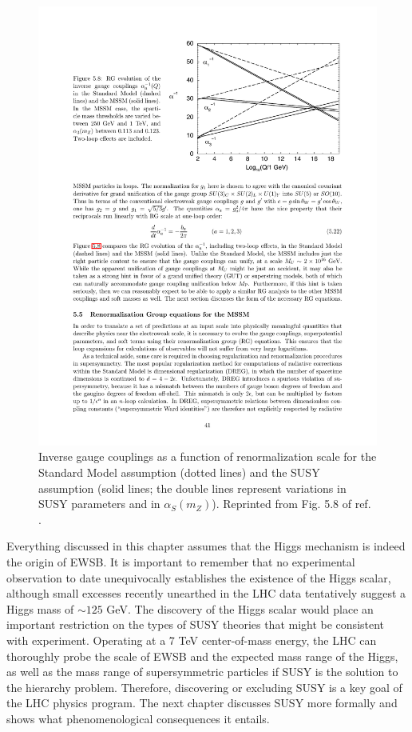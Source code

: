 \documentclass[dissertation.tex]{subfiles}
\begin{document}
\begin{figure}
	\centering
	\includegraphics[scale=1.0]{SUSY_grand_unification}
	\caption{Inverse gauge couplings as a function of renormalization scale for the Standard Model assumption (dotted lines) and the SUSY assumption (solid lines; the double lines represent variations in SUSY parameters and in $\alpha_{S}(m_{Z})$).  Reprinted from Fig. 5.8 of ref. \cite{SUSY_primer}.}
	\label{fig:SUSY_grand_unification}
\end{figure}

Everything discussed in this chapter assumes that the Higgs mechanism is indeed the origin of EWSB.  It is important to remember that no experimental observation to date unequivocally establishes the existence of the Higgs scalar, although small excesses recently unearthed in the LHC data \cite{CMS_Higgs, ATLAS_Higgs} tentatively suggest a Higgs mass of $\sim125$ GeV.  The discovery of the Higgs scalar would place an important restriction on the types of SUSY theories that might be consistent with experiment.  Operating at a 7 TeV center-of-mass energy, the LHC can thoroughly probe the scale of EWSB and the expected mass range of the Higgs, as well as the mass range of supersymmetric particles if SUSY is the solution to the hierarchy problem.  Therefore, discovering or excluding SUSY is a key goal of the LHC physics program.  The next chapter discusses SUSY more formally and shows what phenomenological consequences it entails.
\end{document}
